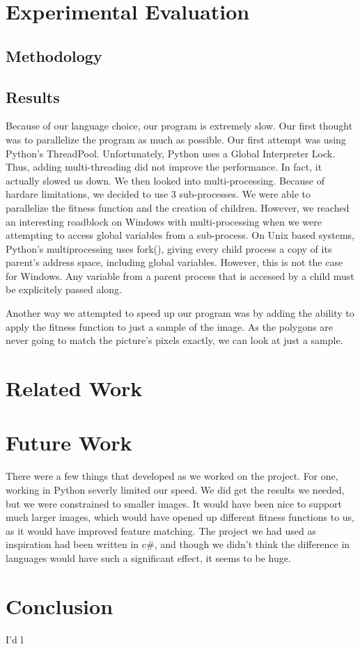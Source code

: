 \documentclass[12pt,letterpaper]{article}
\begin{document}
\section{Experimental Evaluation}

\subsection{Methodology}

\subsection{Results}

Because of our language choice, our program is extremely slow.  Our first thought was to parallelize the program as much as possible.  Our first attempt was using Python's ThreadPool. Unfortunately, Python uses a Global Interpreter Lock.  Thus, adding multi-threading did not improve the performance.  In fact, it actually slowed us down.  We then looked into multi-processing. Because of hardare limitations, we decided to use 3 sub-processes.  We were able to parallelize the fitness function and the creation of children.  However, we reached an interesting roadblock on Windows with multi-processing when we were attempting to access global variables from a sub-process.  On Unix based systems, Python's multiprocessing uses fork(), giving every child process a copy of its parent's address space, including global variables.  However, this is not the case for Windows.  Any variable from a parent process that is accessed by a child must be explicitely passed along.

Another way we attempted to speed up our program was by adding the ability to apply the fitness function to just a sample of the image.  As the polygons are never going to match the picture's pixels exactly, we can look at just a sample.

\section{Related Work}

\section{Future Work}
There were a few things that developed as we worked on the project. For one, working in Python severly limited our speed. We did get the results we needed, but we were constrained to smaller images. It would have been nice to support much larger images, which would have opened up different fitness functions to us, as it would have improved feature matching. The project we had used as inspiration had been written in c\#, and though we didn't think the difference in languages would have such a significant effect, it seems to be huge.

\section{Conclusion}

I'd l
\end{document}

